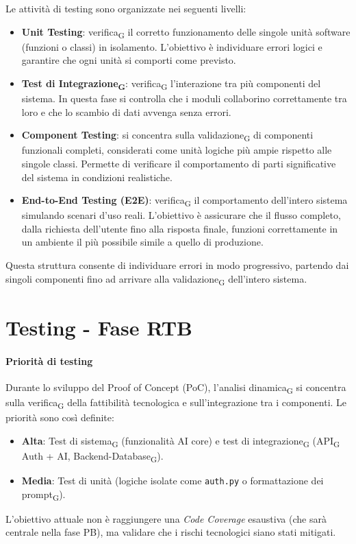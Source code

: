 \documentclass[11pt,a4paper]{article}
\newcommand{\gls}[1]{#1\textsubscript{G}}
\begin{document}
Le attività di testing sono organizzate nei seguenti livelli:
\begin{itemize}
\item \textbf{Unit Testing}: \gls{verifica} il corretto funzionamento delle singole unità software (funzioni o classi) in isolamento. L’obiettivo è individuare errori logici e garantire che ogni unità si comporti come previsto.
\item \textbf{\gls{Test di Integrazione}}: \gls{verifica} l’interazione tra più componenti del sistema. In questa fase si controlla che i moduli collaborino correttamente tra loro e che lo scambio di dati avvenga senza errori.
\item \textbf{Component Testing}: si concentra sulla \gls{validazione} di componenti funzionali completi, considerati come unità logiche più ampie rispetto alle singole classi. Permette di verificare il comportamento di parti significative del sistema in condizioni realistiche.
\item \textbf{End-to-End Testing (E2E)}: \gls{verifica} il comportamento dell’intero sistema simulando scenari d’uso reali. L’obiettivo è assicurare che il flusso completo, dalla richiesta dell’utente fino alla risposta finale, funzioni correttamente in un ambiente il più possibile simile a quello di produzione.
\end{itemize}
Questa struttura consente di individuare errori in modo progressivo, partendo dai singoli componenti fino ad arrivare alla \gls{validazione} dell’intero sistema.


\newpage
\section{Testing - Fase RTB}

\paragraph{Priorità di testing}
Durante lo sviluppo del Proof of Concept (PoC), l'\gls{analisi dinamica} si concentra sulla \gls{verifica} della fattibilità tecnologica e sull'integrazione tra i componenti. Le priorità sono così definite:
\begin{itemize}
    \item \textbf{Alta}: \gls{Test di sistema} (funzionalità AI core) e \gls{test di integrazione} (\gls{API} Auth + AI, Backend-\gls{Database}).
    \item \textbf{Media}: Test di unità (logiche isolate come \texttt{auth.py} o formattazione dei \gls{prompt}).
\end{itemize}
L'obiettivo attuale non è raggiungere una \textit{Code Coverage} esaustiva (che sarà centrale nella fase PB), ma validare che i rischi tecnologici siano stati mitigati.
\end{document}
